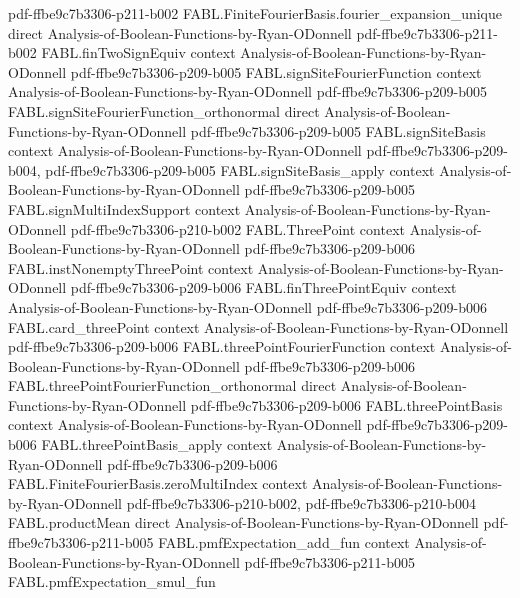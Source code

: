 \begin{theorem}
  {pdf-ffbe9c7b3306-p211-b002}
\proofstep
  {FABL.FiniteFourierBasis.fourier_expansion_unique}
  {direct}
  {Analysis-of-Boolean-Functions-by-Ryan-ODonnell}
  {pdf-ffbe9c7b3306-p211-b002}
\proofstep
  {FABL.finTwoSignEquiv}
  {context}
  {Analysis-of-Boolean-Functions-by-Ryan-ODonnell}
  {pdf-ffbe9c7b3306-p209-b005}
\proofstep
  {FABL.signSiteFourierFunction}
  {context}
  {Analysis-of-Boolean-Functions-by-Ryan-ODonnell}
  {pdf-ffbe9c7b3306-p209-b005}
\proofstep
  {FABL.signSiteFourierFunction_orthonormal}
  {direct}
  {Analysis-of-Boolean-Functions-by-Ryan-ODonnell}
  {pdf-ffbe9c7b3306-p209-b005}
\proofstep
  {FABL.signSiteBasis}
  {context}
  {Analysis-of-Boolean-Functions-by-Ryan-ODonnell}
  {pdf-ffbe9c7b3306-p209-b004,
    pdf-ffbe9c7b3306-p209-b005}
\proofstep
  {FABL.signSiteBasis_apply}
  {context}
  {Analysis-of-Boolean-Functions-by-Ryan-ODonnell}
  {pdf-ffbe9c7b3306-p209-b005}
\proofstep
  {FABL.signMultiIndexSupport}
  {context}
  {Analysis-of-Boolean-Functions-by-Ryan-ODonnell}
  {pdf-ffbe9c7b3306-p210-b002}
\proofstep
  {FABL.ThreePoint}
  {context}
  {Analysis-of-Boolean-Functions-by-Ryan-ODonnell}
  {pdf-ffbe9c7b3306-p209-b006}
\proofstep
  {FABL.instNonemptyThreePoint}
  {context}
  {Analysis-of-Boolean-Functions-by-Ryan-ODonnell}
  {pdf-ffbe9c7b3306-p209-b006}
\proofstep
  {FABL.finThreePointEquiv}
  {context}
  {Analysis-of-Boolean-Functions-by-Ryan-ODonnell}
  {pdf-ffbe9c7b3306-p209-b006}
\proofstep
  {FABL.card_threePoint}
  {context}
  {Analysis-of-Boolean-Functions-by-Ryan-ODonnell}
  {pdf-ffbe9c7b3306-p209-b006}
\proofstep
  {FABL.threePointFourierFunction}
  {context}
  {Analysis-of-Boolean-Functions-by-Ryan-ODonnell}
  {pdf-ffbe9c7b3306-p209-b006}
\proofstep
  {FABL.threePointFourierFunction_orthonormal}
  {direct}
  {Analysis-of-Boolean-Functions-by-Ryan-ODonnell}
  {pdf-ffbe9c7b3306-p209-b006}
\proofstep
  {FABL.threePointBasis}
  {context}
  {Analysis-of-Boolean-Functions-by-Ryan-ODonnell}
  {pdf-ffbe9c7b3306-p209-b006}
\proofstep
  {FABL.threePointBasis_apply}
  {context}
  {Analysis-of-Boolean-Functions-by-Ryan-ODonnell}
  {pdf-ffbe9c7b3306-p209-b006}
\proofstep
  {FABL.FiniteFourierBasis.zeroMultiIndex}
  {context}
  {Analysis-of-Boolean-Functions-by-Ryan-ODonnell}
  {pdf-ffbe9c7b3306-p210-b002,
    pdf-ffbe9c7b3306-p210-b004}
\proofstep
  {FABL.productMean}
  {direct}
  {Analysis-of-Boolean-Functions-by-Ryan-ODonnell}
  {pdf-ffbe9c7b3306-p211-b005}
\proofstep
  {FABL.pmfExpectation_add_fun}
  {context}
  {Analysis-of-Boolean-Functions-by-Ryan-ODonnell}
  {pdf-ffbe9c7b3306-p211-b005}
\proofstep
  {FABL.pmfExpectation_smul_fun}

\end{theorem}

